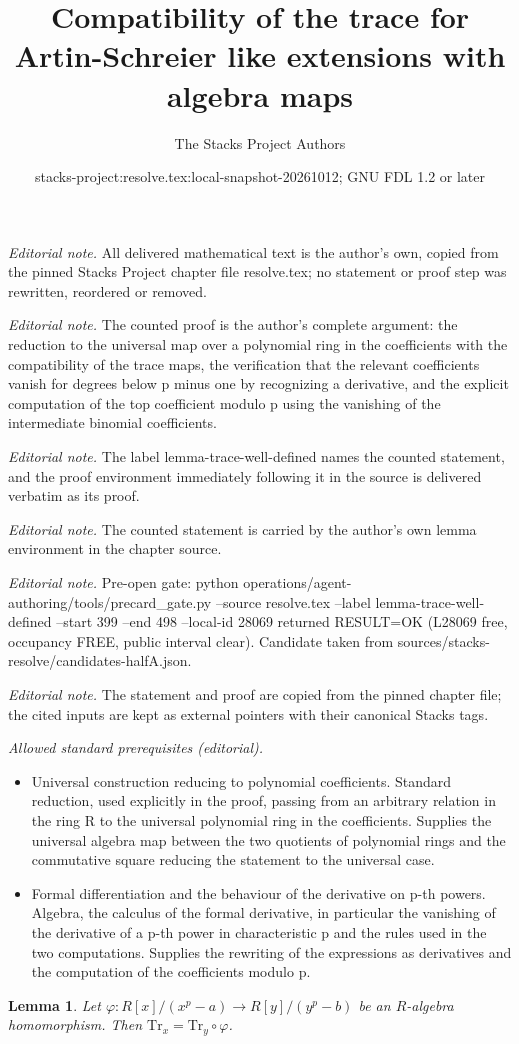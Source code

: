 \documentclass[10pt,a4paper]{amsart}
\title{Compatibility of the trace for Artin-Schreier like extensions with algebra maps}
\author{The Stacks Project Authors}
\date{stacks-project:resolve.tex:local-snapshot-20261012; GNU FDL 1.2 or later}
\theoremstyle{plain}
\newtheorem{lemma}[subsection]{Lemma}
\theoremstyle{definition}
\theoremstyle{remark}
\numberwithin{equation}{subsection}
\begin{document}
\maketitle
\noindent\textit{Editorial note.} All delivered mathematical text is the author's own, copied from the pinned Stacks Project chapter file resolve.tex; no statement or proof step was rewritten, reordered or removed.\par\medskip
\noindent\textit{Editorial note.} The counted proof is the author's complete argument: the reduction to the universal map over a polynomial ring in the coefficients with the compatibility of the trace maps, the verification that the relevant coefficients vanish for degrees below p minus one by recognizing a derivative, and the explicit computation of the top coefficient modulo p using the vanishing of the intermediate binomial coefficients.\par\medskip
\noindent\textit{Editorial note.} The label lemma-trace-well-defined names the counted statement, and the proof environment immediately following it in the source is delivered verbatim as its proof.\par\medskip
\noindent\textit{Editorial note.} The counted statement is carried by the author's own lemma environment in the chapter source.\par\medskip
\noindent\textit{Editorial note.} Pre-open gate: python operations/agent-authoring/tools/precard\_gate.py --source resolve.tex --label lemma-trace-well-defined --start 399 --end 498 --local-id 28069 returned RESULT=OK (L28069 free, occupancy FREE, public interval clear). Candidate taken from sources/stacks-resolve/candidates-halfA.json.\par\medskip
\noindent\textit{Editorial note.} The statement and proof are copied from the pinned chapter file; the cited inputs are kept as external pointers with their canonical Stacks tags.\par\medskip
\noindent\textit{Allowed standard prerequisites (editorial).}\begin{itemize}
\item Universal construction reducing to polynomial coefficients. Standard reduction, used explicitly in the proof, passing from an arbitrary relation in the ring R to the universal polynomial ring in the coefficients. Supplies the universal algebra map between the two quotients of polynomial rings and the commutative square reducing the statement to the universal case.
\item Formal differentiation and the behaviour of the derivative on p-th powers. Algebra, the calculus of the formal derivative, in particular the vanishing of the derivative of a p-th power in characteristic p and the rules used in the two computations. Supplies the rewriting of the expressions as derivatives and the computation of the coefficients modulo p.
\end{itemize}\medskip
\begin{lemma}
\label{lemma-trace-well-defined}
Let $\varphi : R[x]/(x^p - a) \to R[y]/(y^p - b)$ be an $R$-algebra
homomorphism. Then $\text{Tr}_x = \text{Tr}_y \circ \varphi$.
\end{lemma}
\end{document}

